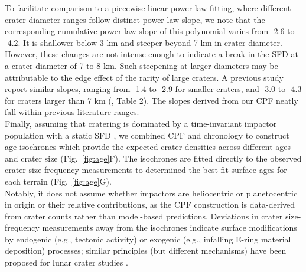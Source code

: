 \documentclass[preprint,12pt,3p,times,authoryear]{elsarticle}
\begin{document}
To facilitate comparison to a piecewise linear power-law fitting, where different crater diameter ranges follow distinct power-law slope, we note that the corresponding cumulative power-law slope of this polynomial varies from -2.6 to -4.2. It is shallower below 3 km and steeper beyond 7 km in crater diameter. However, these changes are not intense enough to indicate a break in the SFD at a crater diameter of 7 to 8 km. Such steepening at larger diameters may be attributable to the edge effect of the rarity of large craters. A previous study report similar slopes, ranging from -1.4 to -2.9 for smaller craters, and -3.0 to -4.3 for craters larger than 7 km (\citealt{Kirchoff2009}, Table 2). The slopes derived from our CPF neatly fall within previous literature ranges.\\

Finally, assuming that cratering is dominated by a time-invariant impactor population with a static SFD %
\citep{Neukum1975,Neukum1983},
we combined CPF and chronology to construct age-isochrones which provide the expected crater densities across different ages and crater size (Fig.~\ref{fig:age}F). The isochrones are fitted directly to the observed crater size-frequency measurements to determined the best-fit surface ages for each terrain (Fig.~\ref{fig:age}G).
\\

Notably, it does not assume whether impactors are heliocentric or planetocentric in origin or their relative contributions, as the CPF construction is data-derived from crater counts rather than model-based predictions. Deviations in crater size-frequency measurements away from the isochrones indicate surface modifications by endogenic (e.g., tectonic activity) or exogenic (e.g., infalling E-ring material deposition) processes; similar principles (but different mechanisms) have been proposed for lunar crater studies \citep{Neukum1975}.\\
\end{document}
